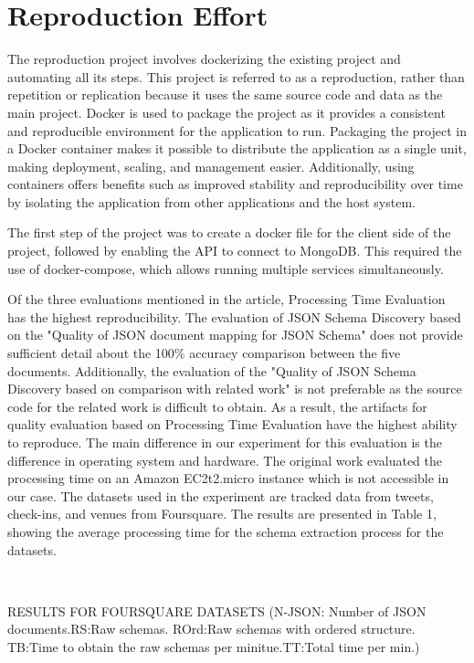 \documentclass[sigconf]{acmart}
\begin{document}
\section{Reproduction Effort}
The reproduction project involves dockerizing the existing project and automating all its steps. This project is referred to as a reproduction, rather than repetition or replication because it uses the same source code and data as the main project. Docker is used to package the project as it provides a consistent and reproducible environment for the application to run. Packaging the project in a Docker container makes it possible to distribute the application as a single unit, making deployment, scaling, and management easier. Additionally, using containers offers benefits such as improved stability and reproducibility over time by isolating the application from other applications and the host system.

The first step of the project was to create a docker file for the client side of the project, followed by enabling the API to connect to MongoDB. This required the use of docker-compose, which allows running multiple services simultaneously. 

Of the three evaluations mentioned in the article, Processing Time Evaluation has the highest reproducibility. The evaluation of JSON Schema Discovery based on the "Quality of JSON document mapping for JSON Schema" does not provide sufficient detail about the 100\% accuracy comparison between the five documents. Additionally, the evaluation of the "Quality of JSON Schema Discovery based on comparison with related work" is not preferable as the source code for the related work is difficult to obtain. As a result, the artifacts for quality evaluation based on Processing Time Evaluation have the highest ability to reproduce. The main difference in our experiment for this evaluation is the difference in operating system and hardware. The original work evaluated the processing time on an Amazon EC2t2.micro instance which is not accessible in our case. The datasets used in the experiment are tracked data from tweets, check-ins, and venues from Foursquare. The results are presented in Table 1, showing the average processing time for the schema extraction process for the datasets.

\begin{table}
  \
  \label{tab:freq}
   

  \caption{RESULTS FOR FOURSQUARE DATASETS
  (N-JSON: Number of JSON documents.RS:Raw schemas.
  ROrd:Raw schemas with ordered structure.
  TB:Time to obtain the raw schemas per minitue.TT:Total time per min.)
  }
\end{table}
\end{document}
